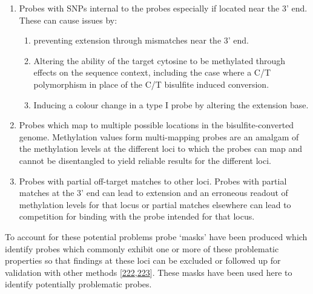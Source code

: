 \documentclass[
]{book}
\providecommand{\tightlist}{%
  \setlength{\itemsep}{0pt}\setlength{\parskip}{0pt}}
\begin{document}
\begin{enumerate}
\def\labelenumi{\arabic{enumi}.}
\tightlist
\item
  Probes with SNPs internal to the probes especially if located near the 3' end.
  These can cause issues by:

  \begin{enumerate}
  \def\labelenumii{\alph{enumii})}
  \tightlist
  \item
    preventing extension through mismatches near the 3' end.
  \item
    Altering the ability of the target cytosine to be methylated through effects on the sequence context, including the case where a C/T polymorphism in place of the C/T bisulfite induced conversion.
  \item
    Inducing a colour change in a type I probe by altering the extension base.
  \end{enumerate}
\item
  Probes which map to multiple possible locations in the bisulfite-converted genome.
  Methylation values form multi-mapping probes are an amalgam of the methylation levels at the different loci to which the probes can map and cannot be disentangled to yield reliable results for the different loci.
\item
  Probes with partial off-target matches to other loci.
  Probes with partial matches at the 3' end can lead to extension and an erroneous readout of methylation levels for that locus or partial matches elsewhere can lead to competition for binding with the probe intended for that locus.
\end{enumerate}

To account for these potential problems probe `masks' have been produced which identify probes which commonly exhibit one or more of these problematic properties so that findings at these loci can be excluded or followed up for validation with other methods {[}\protect\hyperlink{ref-Pidsley2016}{222},\protect\hyperlink{ref-Zhou2017}{223}{]}.
These masks have been used here to identify potentially problematic probes.
\end{document}
